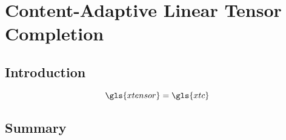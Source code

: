 \chapter{Content-Adaptive Linear Tensor Completion} \label{chapter:caltec}

\section{Introduction} \label{sec:caltec:intro}

\begin{equation}
	\gls{xtensor} = \gls{xtc}
\end{equation}



\section{Summary} \label{sec:methods:summary} 